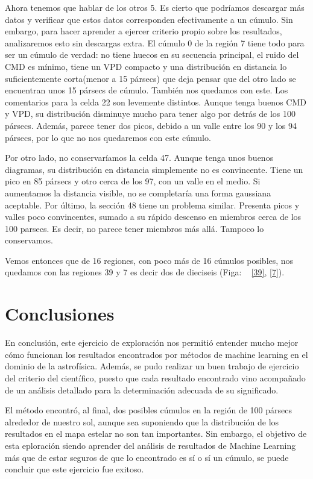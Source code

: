 \documentclass[10pt,twocolumn]{article}
\begin{document}
Ahora tenemos que hablar de los otros 5. Es cierto que podríamos descargar más datos y verificar que estos datos
corresponden efectivamente a un cúmulo. Sin embargo, para hacer aprender a ejercer criterio propio sobre los resultados, 
analizaremos esto sin descargas extra. El cúmulo 0 de la región 7 tiene todo para ser un cúmulo de verdad: no tiene huecos 
en su secuencia principal, el ruido del CMD es mínimo, tiene un VPD compacto y una distribución en distancia lo suficientemente
corta(menor a 15 pársecs) que deja pensar que del otro lado se encuentran unos 15 pársecs de cúmulo. También nos quedamos con este. 
Los comentarios para la celda 22 son levemente distintos. Aunque tenga buenos CMD y VPD, su distribución disminuye mucho para tener
algo por detrás de los 100 pársecs. Además, parece tener dos picos, debido a un valle entre los 90 y los 94 pársecs, por lo que no nos
quedaremos con este cúmulo. 

Por otro lado, no conservaríamos la celda 47. Aunque tenga unos
buenos diagramas, su distribución en distancia simplemente no es convincente. Tiene un pico en 85 pársecs y otro cerca de los 97, con un valle
en el medio. Si aumentamos la distancia visible, no se completaría una forma gaussiana aceptable. Por último, la sección 48 tiene un problema similar.
Presenta picos y valles poco convincentes, sumado a su rápido descenso en miembros cerca de los 100 parsecs. Es decir, no parece tener miembros más allá. 
Tampoco lo conservamos. 

Vemos entonces que de 16 regiones, con poco más de 16 cúmulos posibles, nos quedamos con las regiones 39 y 7 es decir dos de dieciseis (Figa: ~ \ref{39}, \ref{7}). 

\section{Conclusiones}

En conclusión, este ejercicio de exploración nos permitió entender mucho mejor cómo funcionan los resultados encontrados por métodos de 
machine learning en el dominio de la astrofísica. Además, se pudo realizar un buen trabajo de ejercicio del criterio del científico, 
puesto que cada resultado encontrado vino acompañado de un análisis detallado para la determinación adecuada de su significado. 

El método encontró, al final, dos posibles cúmulos en la región de 100 pársecs alrededor de nuestro sol, aunque sea suponiendo 
que la distribución de los resultados en el mapa estelar no son tan importantes. Sin embargo, el objetivo de esta eploración siendo 
aprender del análisis de resultados de Machine Learning más que de estar seguros de que lo encontrado es sí o sí un cúmulo, se puede 
concluir que este ejercicio fue exitoso. 
\end{document}
